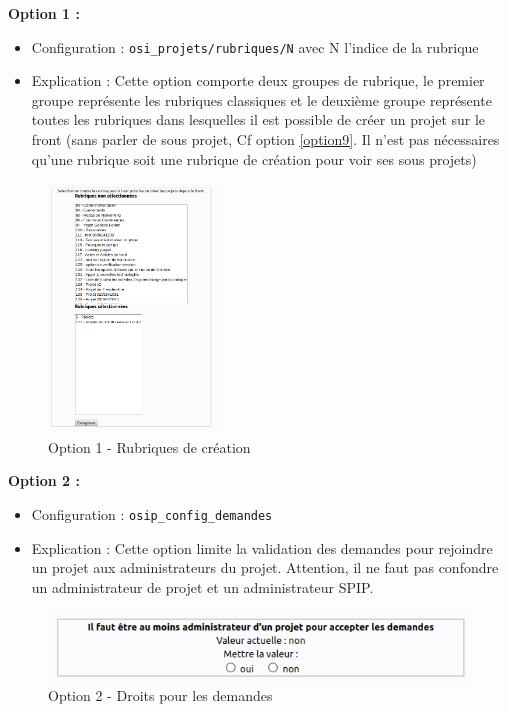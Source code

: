 \textbf{Option 1 :} 
\begin{itemize}
    \item Configuration : \texttt{osi\_projets/rubriques/N} avec N l'indice de la rubrique
    \item Explication : Cette option comporte deux groupes de rubrique, le premier groupe représente les rubriques classiques et le deuxième groupe représente toutes les rubriques dans lesquelles il est possible de créer un projet sur le front (sans parler de sous projet, Cf option \ref{option9}. Il n'est pas nécessaires qu'une rubrique soit une rubrique de création pour voir ses sous projets)
\end{itemize}
\vspace{0.5cm}
\begin{figure}[h]
    \centering
    \includegraphics[trim=0 0 0 0, clip, width=0.4\textwidth]{./images/c1.png}
    \caption{Option 1 - Rubriques de création}
    \label{option1}
\end{figure}
\vspace{0.5cm}
\newpage

\textbf{Option 2 :} 
\begin{itemize}
    \item Configuration : \texttt{osip\_config\_demandes}
    \item Explication : Cette option limite la validation des demandes pour rejoindre un projet aux administrateurs du projet. Attention, il ne faut pas confondre un administrateur de projet et un administrateur SPIP.
\end{itemize}

\vspace{0.5cm}
\begin{figure}[h]
    \centering
    \includegraphics[trim=0 0 0 0, clip, width=1\textwidth]{./images/c2.png}
    \caption{Option 2 - Droits pour les demandes}
    \label{option2}
\end{figure}
\vspace{0.5cm}

